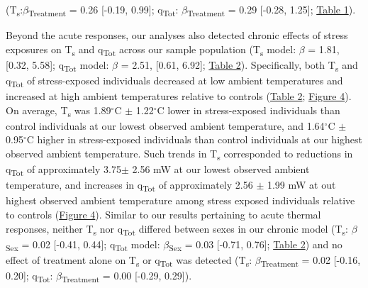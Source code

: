 \documentclass[12pt]{article}
\begin{document}
(T\textsubscript{s}:$\beta$\textsubscript{Treatment} = 0.26 [-0.19, 0.99]; q\textsubscript{Tot}: $\beta$\textsubscript{Treatment} = 0.29 [-0.28, 1.25]; \hyperref[Tab4.1]{Table 1}). \vspace{1cm}

\noindent Beyond the acute responses, our analyses also detected chronic effects of stress exposures on T\textsubscript{s} and q\textsubscript{Tot} across our sample population (T\textsubscript{s} model: $\beta$ = 1.81, [0.32, 5.58]; q\textsubscript{Tot} model: $\beta$ = 2.51, [0.61, 6.92]; \hyperref[Tab4.2]{Table 2}). Specifically, both T\textsubscript{s} and q\textsubscript{Tot} of stress-exposed individuals decreased at low ambient temperatures and increased at high ambient temperatures relative to controls (\hyperref[Tab4.2]{Table 2}; \hyperref[Fig4.4]{Figure 4}). On average, T\textsubscript{s} was 1.89$^{\circ}$C $\pm$ 1.22$^{\circ}$C lower in stress-exposed individuals than control individuals at our lowest observed ambient temperature, and 1.64$^{\circ}$C $\pm$0.95$^{\circ}$C higher in stress-exposed individuals than control individuals at our highest observed ambient temperature. Such trends in T\textsubscript{s} corresponded to reductions in q\textsubscript{Tot} of approximately 3.75$\pm$ 2.56 mW at our lowest observed ambient temperature, and increases in q\textsubscript{Tot} of approximately 2.56 $\pm$ 1.99 mW at out highest observed ambient temperature among stress exposed individuals relative to controls (\hyperref[Fig4.4]{Figure 4}). Similar to our results pertaining to acute thermal responses, neither T\textsubscript{s} nor q\textsubscript{Tot} differed between sexes in our chronic model (T\textsubscript{s}: $\beta$\textsubscript{Sex} = 0.02 [-0.41, 0.44]; q\textsubscript{Tot} model: $\beta$\textsubscript{Sex} = 0.03 [-0.71, 0.76]; \hyperref[Tab4.2]{Table 2}) and no effect of treatment alone on T\textsubscript{s} or q\textsubscript{Tot} was detected (T\textsubscript{s}: $\beta$\textsubscript{Treatment} = 0.02 [-0.16, 0.20]; q\textsubscript{Tot}: $\beta$\textsubscript{Treatment} = 0.00 [-0.29, 0.29]). \vspace{1cm}
\end{document}
